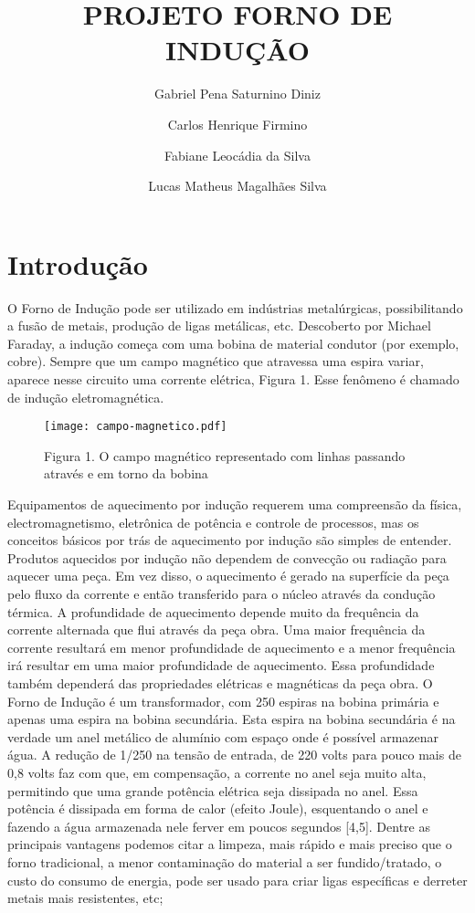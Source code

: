 \documentclass[a4paper,12pt]{article}%
\title{PROJETO
	FORNO DE INDUÇÃO
}
\author{Gabriel Pena Saturnino Diniz \and Carlos Henrique Firmino\and Fabiane Leocádia da Silva \and Lucas Matheus Magalhães Silva}
\begin{document}
\maketitle
\section{Introdução} 

O Forno de Indução pode ser utilizado em indústrias metalúrgicas, possibilitando a fusão de metais, produção de ligas metálicas, etc. Descoberto por Michael Faraday, a indução começa com uma bobina de material condutor (por exemplo, cobre). Sempre que um campo magnético que atravessa uma espira variar, aparece nesse circuito uma corrente elétrica, Figura 1. Esse fenômeno é chamado de indução eletromagnética.\cite{halliday}\cite{mecanica}
\begin{figure}
	\centering	
	\texttt{[image: campo-magnetico.pdf]}
	\caption{Figura 1. O campo magnético representado com linhas passando através e em torno da bobina}\cite{4}
	\label{fig:01}
\end{figure}
Equipamentos de aquecimento por indução requerem uma compreensão da física, electromagnetismo, eletrônica de potência e controle de processos, mas os conceitos básicos por trás de aquecimento por indução são simples de entender.
Produtos aquecidos por indução não dependem de convecção ou radiação para aquecer uma peça. Em vez disso, o aquecimento é gerado na superfície da peça pelo fluxo da corrente e então transferido para o núcleo através da condução térmica.
A profundidade de aquecimento depende muito da frequência da corrente alternada que flui através da peça obra. Uma maior frequência da corrente resultará em menor profundidade de aquecimento e a menor frequência irá resultar em uma maior profundidade de aquecimento. Essa profundidade também dependerá das propriedades elétricas e magnéticas da peça obra.
O Forno de Indução é um transformador, com 250 espiras na bobina primária e apenas uma espira na bobina secundária. Esta espira na bobina secundária é na verdade um anel metálico de alumínio com espaço onde é possível armazenar água. A redução de 1/250 na tensão de entrada, de 220 volts para pouco mais de 0,8 volts faz com que, em compensação, a corrente no anel seja muito alta, permitindo que uma grande potência elétrica seja dissipada no anel. Essa potência é dissipada em forma de calor (efeito Joule), esquentando o anel e fazendo a água armazenada nele ferver em poucos segundos [4,5].
Dentre as principais vantagens podemos citar a limpeza, mais rápido e mais preciso que o forno tradicional, a menor contaminação do material a ser fundido/tratado, o custo do consumo de energia, pode ser usado para criar ligas específicas e derreter metais mais resistentes, etc; 
\end{document}
